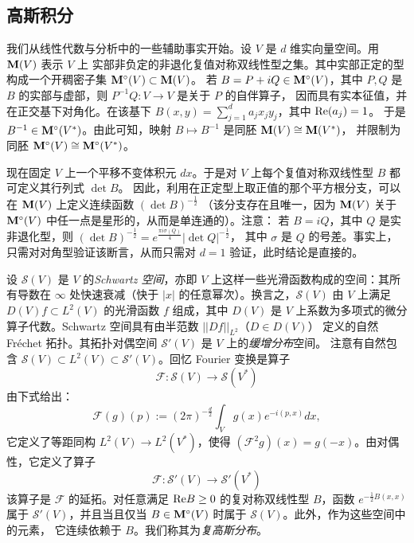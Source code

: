 \subsection{高斯积分}

我们从线性代数与分析中的一些辅助事实开始。设 $V$ 是 $d$ 维实向量空间。用 $\bold M(V)$ 表示 $V$ 上
实部非负定的非退化复值对称双线性型之集。其中实部正定的型构成一个开稠密子集 $\bold M^\circ(V)\subset \bold M(V)$。
若 $B=P+iQ\in \bold M^\circ(V)$，其中 $P,Q$ 是 $B$ 的实部与虚部，则 $P^{-1}Q: V\to V$ 是关于 $P$ 的自伴算子，
因而具有实本征值，并在正交基下对角化。在该基下 $B(x,y)=\sum_{j=1}^d a_jx_jy_j$，其中 ${\rm Re}(a_j)=1$。
于是 $B^{-1}\in \bold M^\circ(V^*)$。由此可知，映射 $B\mapsto B^{-1}$ 是同胚 $\bold M(V)\cong \bold M(V^*)$，
并限制为同胚 $\bold M^\circ (V)\cong \bold M^\circ(V^*)$。

现在固定 $V$ 上一个平移不变体积元 $dx$。于是对 $V$ 上每个复值对称双线性型 $B$ 都可定义其行列式 $\det B$。
因此，利用在正定型上取正值的那个平方根分支，可以在 $\bold M(V)$ 上定义连续函数 $(\det B)^{-\frac{1}{2}}$
（该分支存在且唯一，因为 $\bold M(V)$ 关于 $\bold M^\circ(V)$ 中任一点是星形的，从而是单连通的）。注意：
若 $B=iQ$，其中 $Q$ 是实非退化型，则 $(\det B)^{-\frac{1}{2}}=e^{\frac{\pi i\sigma(Q)}{4}}|\det Q|^{-\frac{1}{2}}$，
其中 $\sigma$ 是 $Q$ 的号差。事实上，只需对对角型验证该断言，从而只需对 $d=1$ 验证，此时结论是直接的。


设 $\mathcal S(V)$ 是 $V$ 的\emph{Schwartz 空间}，亦即 $V$ 上这样一些光滑函数构成的空间：其所有导数在 $\infty$
处快速衰减（快于 $|x|$ 的任意幂次）。换言之，$\mathcal S(V)$ 由 $V$ 上满足 $D(V)f\subset L^2(V)$ 的光滑函数 $f$
组成，其中 $D(V)$ 是 $V$ 上系数为多项式的微分算子代数。Schwartz 空间具有由半范数 $||Df||_{L^2}$（$D\in D(V)$）
定义的自然 Fr\'echet 拓扑。其拓扑对偶空间 $\mathcal S'(V)$ 是 $V$ 上的\emph{缓增分布}空间。
注意有自然包含 $\mathcal S(V)\subset L^2(V)\subset \mathcal S'(V)$。回忆 Fourier 变换是算子
$$
\mathcal F: \mathcal S(V)\to \mathcal S(V^*)
$$
由下式给出：
$$
\mathcal F(g)(p):=(2\pi)^{-\frac{d}{2}}\int_V g(x)e^{-i(p,x)}dx,
$$
它定义了等距同构 $L^2(V)\to L^2(V^*)$，使得 $(\mathcal F^2g)(x)=g(-x)$。由对偶性，它定义了算子
$$
\mathcal F: \mathcal S'(V)\to \mathcal S'(V^*) 
$$
该算子是 $\mathcal F$ 的延拓。对任意满足 ${\rm Re}B\ge 0$ 的复对称双线性型 $B$，函数 $e^{-\frac{1}{2}B(x,x)}$
属于 $\mathcal S'(V)$，并且当且仅当 $B\in \bold M^\circ(V)$ 时属于 $\mathcal S(V)$。此外，作为这些空间中的元素，
它连续依赖于 $B$。我们称其为\emph{复高斯分布}。

